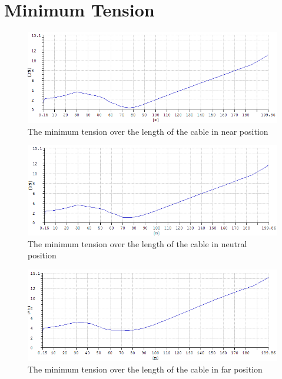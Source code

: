 \section{Minimum Tension}

\begin{figure}[H]
\centering
\includegraphics[scale=0.5]{figures/fminnear}
\caption[$\; \:$The minimum tension over the length of the cable in near position]{The minimum tension over the length of the cable in near position}
 \label{fig:fminnear}
\end{figure}


\begin{figure}[H]
\centering
\includegraphics[scale=0.5]{figures/fminneu}
\caption[$\; \:$The minimum tension over the length of the cable in neutral position]{The minimum tension over the length of the cable in neutral position}
 \label{fig:fminneu}
\end{figure}


\begin{figure}[H]
\centering
\includegraphics[scale=0.5]{figures/fminfar}
\caption[$\; \:$The minimum tension over the length of the cable in far position]{The minimum tension over the length of the cable in far position}
 \label{fig:fminfar}
\end{figure}



